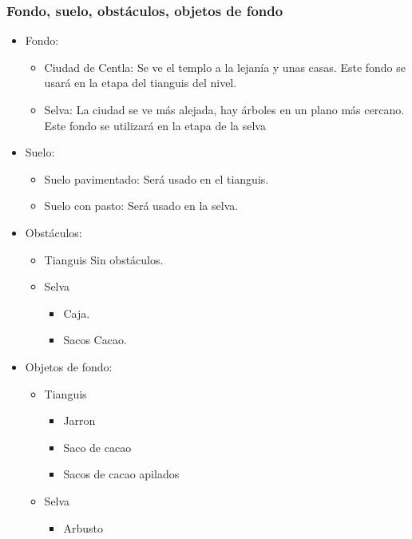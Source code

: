 \documentclass[11pt,letterpaper]{article}
\begin{document}
\subsubsection{Fondo, suelo, obstáculos, objetos de fondo}
\begin{itemize} 
	\item Fondo:
\begin{itemize}
			\item Ciudad de Centla: Se ve el templo a la lejanía y unas casas. Este fondo se usará en la etapa del tianguis del nivel.
			\item Selva: La ciudad se ve más alejada, hay árboles en un plano más cercano. Este fondo se utilizará en la etapa de la selva  
\end{itemize}	
	\item Suelo:
		\begin{itemize}
			\item Suelo pavimentado: Será usado en el tianguis.
			\item Suelo con pasto: Será usado en la selva.
		\end{itemize}
	\item Obstáculos:
		\begin{itemize}
			\item Tianguis
				Sin obstáculos.
			\item Selva
				\begin{itemize}
					\item Caja.
					\item Sacos Cacao.
				\end{itemize}
		\end{itemize}
	\item Objetos de fondo:
		\begin{itemize}
			\item Tianguis
				\begin{itemize}
					\item Jarron
					\item Saco de cacao
					\item Sacos de cacao apilados
				\end{itemize}
			\item Selva
				\begin{itemize}
					\item Arbusto
				\end{itemize}

		\end{itemize}
\end{itemize}	
\end{document}
